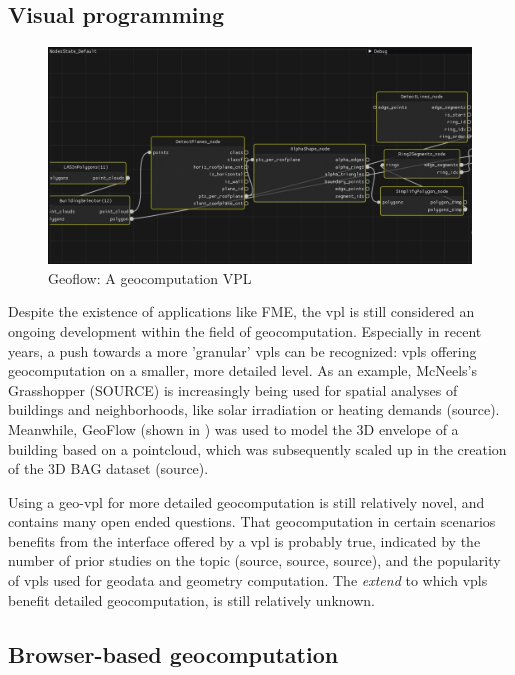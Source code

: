 \subsection*{Visual programming}

\begin{figure}
  \centering
  \graphicspath{{../../assets/images/background/geo-vpl/}}
  \includegraphics[width=\linewidth]{geoflow.png}
  \caption{Geoflow: A geocomputation VPL}
  \label{fig:1:geoflow}
\end{figure}


Despite the existence of applications like FME, the \ac{vpl} is still considered an ongoing development within the field of geocomputation. 
Especially in recent years, a push towards a more 'granular' \ac{vpl}s can be recognized: 
\ac{vpl}s offering geocomputation on a smaller, more detailed level. 
As an example, McNeels's Grasshopper (SOURCE) is increasingly being used for spatial analyses of buildings and neighborhoods, like solar irradiation or heating demands (source). 
Meanwhile, GeoFlow (shown in ) was used to model the 3D envelope of a building based on a pointcloud, which was subsequently scaled up in the creation of the 3D BAG dataset (source).

Using a \ac{geo-vpl} for more detailed geocomputation is still relatively novel, and contains many open ended questions. That geocomputation in certain scenarios benefits from the interface offered by a \ac{vpl} is probably true, indicated by the number of prior studies on the topic (source, source, source), and the popularity of \ac{vpl}s used for geodata and geometry computation. The \emph{extend} to which \ac{vpl}s benefit detailed geocomputation, is still relatively unknown. 

\subsection*{Browser-based geocomputation}

